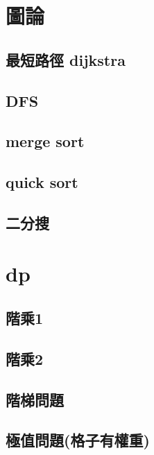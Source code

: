 \section{圖論}
    \subsection{最短路徑 dijkstra}
        
    \subsection{DFS}
        
    \subsection{merge sort}
          
    \subsection{quick sort}
        
    \subsection{二分搜}
        
\section{dp}
    \subsection{階乘1}
        
    \subsection{階乘2}
        
    \subsection{階梯問題}
        
     \subsection{極值問題(格子有權重)}
        
